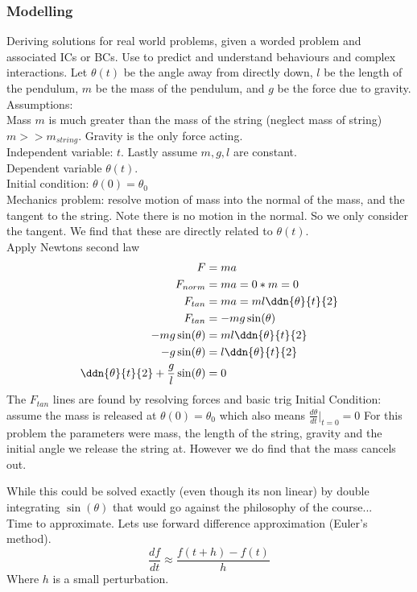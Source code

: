 \documentclass{/home/janmebows/Documents/LatexTemplates/myassignment}
\begin{document}
\subsubsection{Modelling}
Deriving solutions for real world problems, given a worded problem and associated ICs or BCs. Use to predict and understand behaviours and complex interactions.
Let $\theta(t)$ be the angle away from directly down, $l$ be the length of the pendulum, $m$ be the mass of the pendulum, and $g$ be the force due to gravity.\\
Assumptions:\\
Mass $m$ is much greater than the mass of the string (neglect mass of string) $m >> m_{string}$. Gravity is the only force acting.\\
Independent variable: $t$. Lastly assume $m,g,l$ are constant.\\
Dependent variable $\theta(t)$.\\
Initial condition: $\theta(0) = \theta_0$\\
Mechanics problem: resolve motion of mass into the normal of the mass, and the tangent to the string. Note there is no motion in the normal. So we only consider the tangent. We find that these are directly related to $\theta(t)$. \\
Apply Newtons second law
\begin{align*}
    F&=ma\\
    F_{norm}&= ma = 0*m = 0\\
    F_{tan}&= ma=ml\ddn{\theta}{t}{2}\\
    F_{tan} &=-mg \sin(\theta)\\
    -mg\sin(\theta) &= ml\ddn{\theta}{t}{2}\\
    -g\sin(\theta) &= l \ddn{\theta}{t}{2}\\
    \ddn{\theta}{t}{2} + \frac{g}{l} \sin(\theta)&= 0
\end{align*}
The $F_{tan}$ lines are found by resolving forces and basic trig
Initial Condition: assume the mass is released at $\theta(0) = \theta_0$ which also means $\frac{d\theta}{dt}|_{t=0} = 0$ 
For this problem the parameters were mass, the length of the string, gravity and the initial angle we release the string at. However we do find that the mass cancels out.

While this could be solved exactly (even though its non linear) by double integrating $\sin(\theta)$ that would go against the philosophy of the course...\\
Time to approximate. Lets use forward difference approximation (Euler's method).
\[\frac{df}{dt} \approx \frac{f(t+h) - f(t)}{h}\]
Where $h$ is a small perturbation.
\end{document}
